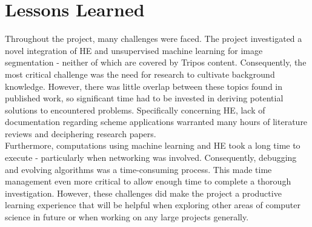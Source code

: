 \section{Lessons Learned}
\indent \indent
Throughout the project, many challenges were faced. The project investigated a novel integration of HE and unsupervised machine learning for image segmentation - neither of which are covered by Tripos content. Consequently, the most critical challenge was the need for research to cultivate background knowledge. However, there was little overlap between these topics found in published work, so significant time had to be invested in deriving potential solutions to encountered problems. Specifically concerning HE, lack of documentation regarding scheme applications warranted many hours of literature reviews and deciphering research papers. 
\smallskip \\ \indent
Furthermore, computations using machine learning and HE took a long time to execute - particularly when networking was involved. Consequently, debugging and evolving algorithms was a time-consuming process. This made time management even more critical to allow enough time to complete a thorough investigation. However, these challenges did make the project a productive learning experience that will be helpful when exploring other areas of computer science in future or when working on any large projects generally.







